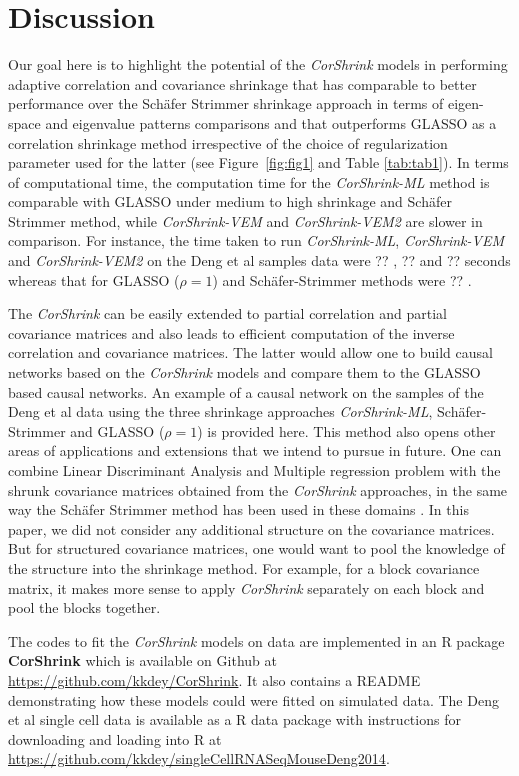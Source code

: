  \section{Discussion}
 
Our goal here is to highlight the potential of the \textit{CorShrink} models in performing adaptive correlation and covariance shrinkage that has comparable to better performance over the Sch\"{a}fer Strimmer shrinkage approach in terms of eigen-space and eigenvalue patterns comparisons and that outperforms GLASSO as a correlation shrinkage method irrespective of the choice of regularization parameter used for the latter (see Figure~\ref{fig:fig1} and Table \ref{tab:tab1}).
In terms of computational time, the computation time for the \textit{CorShrink-ML} method is comparable with GLASSO under medium to high shrinkage and Sch\"{a}fer Strimmer method, while \textit{CorShrink-VEM} and \textit{CorShrink-VEM2} are slower in comparison. For instance, the time taken to run \textit{CorShrink-ML}, \textit{CorShrink-VEM} and \textit{CorShrink-VEM2} on the Deng et al samples data were ?? , ??  and ??  seconds whereas that for GLASSO ($\rho =1$) and Sch\"{a}fer-Strimmer methods were ??  . 

The \textit{CorShrink} can be easily extended to partial correlation and partial covariance matrices and also leads to efficient computation of the inverse correlation and covariance matrices. The latter would allow one to build causal networks based on the \textit{CorShrink} models and compare them to the GLASSO based causal networks. An example of a causal network on the samples of the Deng et al data using  the three shrinkage approaches \textit{CorShrink-ML}, Sch\"{a}fer-Strimmer and GLASSO ($\rho=1$) is provided here. This method also opens other areas of applications and extensions that we intend to pursue in future. One can combine Linear Discriminant Analysis and  Multiple regression problem with the shrunk covariance matrices obtained from the \textit{CorShrink} approaches, in the same way the Sch\"{a}fer Strimmer method has been used in these domains \cite{Xu2009} \cite{Schafer2005}. In this paper, we did not consider any additional structure on the covariance matrices. But for structured covariance matrices, one would want to pool the knowledge of the structure into the shrinkage method. For example, for a block covariance matrix, it makes more sense to apply \textit{CorShrink} separately on each block and pool the blocks together. 


The codes to fit the \textit{CorShrink} models on data are implemented in an R package \textbf{CorShrink} which is available on Github at \url{https://github.com/kkdey/CorShrink}. It also contains a README demonstrating how these models could were fitted on simulated data. The Deng et al single cell data \cite{Deng2014} is available as a R data package with instructions for downloading and loading into R at \url{https://github.com/kkdey/singleCellRNASeqMouseDeng2014}.

